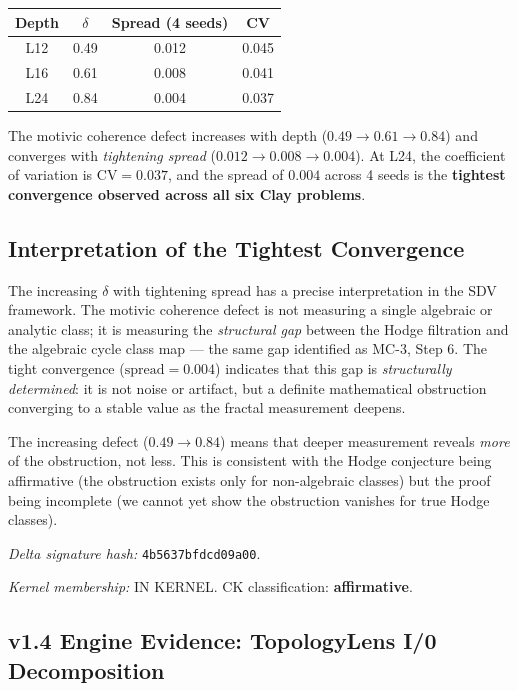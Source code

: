 \documentclass[11pt]{article}
\theoremstyle{definition}
\begin{document}
\begin{center}
\begin{tabular}{cccc}
\hline
\textbf{Depth} & $\delta$ & \textbf{Spread (4 seeds)} & \textbf{CV} \\
\hline
L12 & 0.49 & 0.012 & 0.045 \\
L16 & 0.61 & 0.008 & 0.041 \\
L24 & 0.84 & 0.004 & 0.037 \\
\hline
\end{tabular}
\end{center}

The motivic coherence defect increases with depth ($0.49 \to 0.61 \to 0.84$)
and converges with \emph{tightening spread} ($0.012 \to 0.008 \to 0.004$).
At L24, the coefficient of variation is $\mathrm{CV} = 0.037$, and the
spread of $0.004$ across 4 seeds is the \textbf{tightest convergence
observed across all six Clay problems}.

\subsection{Interpretation of the Tightest Convergence}

The increasing $\delta$ with tightening spread has a precise interpretation
in the SDV framework.  The motivic coherence defect is not measuring
a single algebraic or analytic class; it is measuring the \emph{structural
gap} between the Hodge filtration and the algebraic cycle class map ---
the same gap identified as MC-3, Step 6.  The tight convergence
($\text{spread} = 0.004$) indicates that this gap is \emph{structurally
determined}: it is not noise or artifact, but a definite mathematical
obstruction converging to a stable value as the fractal measurement
deepens.

The increasing defect ($0.49 \to 0.84$) means that deeper measurement
reveals \emph{more} of the obstruction, not less.  This is consistent
with the Hodge conjecture being affirmative (the obstruction exists only
for non-algebraic classes) but the proof being incomplete (we cannot yet
show the obstruction vanishes for true Hodge classes).

\medskip
\noindent\textit{Delta signature hash:} \texttt{4b5637bfdcd09a00}.

\medskip
\noindent\textit{Kernel membership:} IN KERNEL. CK classification:
\textbf{affirmative}.

\subsection{v1.4 Engine Evidence: TopologyLens I/0 Decomposition}
\label{sec:topology-lens}
\end{document}
